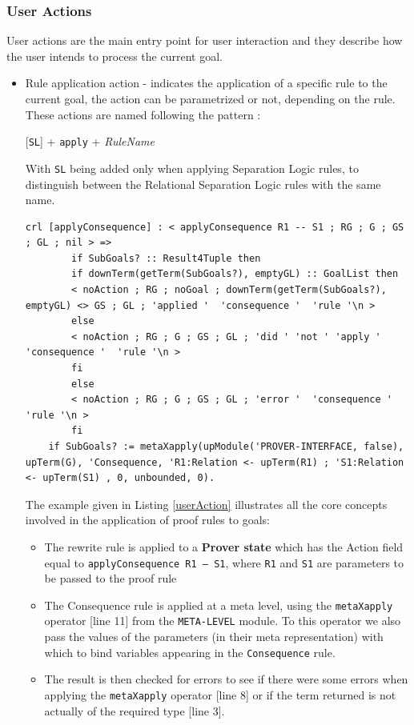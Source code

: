 \documentclass[12pt,a4paper]{article}
\begin{document}
{\subsubsection{User Actions}
User actions are the main entry point for user interaction and they describe how the user intends to process the current goal.
\begin{itemize}
	\item {Rule application action - indicates the application of a specific rule to the current goal, the action can be parametrized or not, depending on the rule. These actions are named following the pattern :	
	\begin{center}
		[\texttt{SL}] + \texttt{apply} + \textit{RuleName}
	\end{center}
		With \texttt{SL} being added only when applying Separation Logic rules, to distinguish between the Relational Separation Logic rules with the same name.
	}
		\begin{lstlisting}[label=userAction,caption=Rule Application Action]
	crl [applyConsequence] : < applyConsequence R1 -- S1 ; RG ; G ; GS ; GL ; nil > =>
		if SubGoals? :: Result4Tuple then 
		if downTerm(getTerm(SubGoals?), emptyGL) :: GoalList then
		< noAction ; RG ; noGoal ; downTerm(getTerm(SubGoals?), emptyGL) <> GS ; GL ; 'applied '  'consequence '  'rule '\n > 
		else
		< noAction ; RG ; G ; GS ; GL ; 'did ' 'not ' 'apply ' 'consequence '  'rule '\n > 
		fi
		else 
		< noAction ; RG ; G ; GS ; GL ; 'error '  'consequence '  'rule '\n > 
		fi 
	if SubGoals? := metaXapply(upModule('PROVER-INTERFACE, false), upTerm(G), 'Consequence, 'R1:Relation <- upTerm(R1) ; 'S1:Relation <- upTerm(S1) , 0, unbounded, 0).\end{lstlisting}
		The example given in Listing \ref{userAction} illustrates all the core concepts involved in the application of proof rules to goals: 
		\begin{itemize}
			\item The rewrite rule is applied to a \textbf{Prover state} which has the Action field equal to \texttt{applyConsequence R1 --- S1}, where \texttt{R1} and \texttt{S1} are parameters to be passed to the proof rule
			\item The Consequence rule is applied at a meta level, using the \texttt{metaXapply} operator [line 11] from the \texttt{META-LEVEL} module. To this operator we also pass the values of the parameters (in their meta representation) with which to bind variables appearing in the \texttt{Consequence} rule.
			\item The result is then checked for errors to see if there were some errors when applying the \texttt{metaXapply} operator [line 8] or if the term returned is not actually of the required type [line 3].

\end{itemize}
\end{itemize}}
\end{document}
